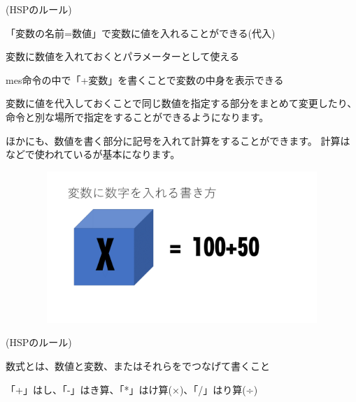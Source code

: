 \begin{description}
    \item (HSPのルール)
\end{description}

\begin{description}
    \item 「変数の名前=数値」で変数に値を入れることができる(代入)
    \item 変数に数値を入れておくとパラメーターとして使える
    \item mes命令の中で「+変数」を書くことで変数の中身を表示できる
\end{description}

変数に値を代入しておくことで同じ数値を指定する部分をまとめて変更したり、命令と別な場所で指定をすることができるようになります。

ほかにも、数値を書く部分に記号を入れて計算をすることができます。
計算はなどで使われているが基本になります。

\begin{figure}[H]
    \begin{center}
        \includegraphics[keepaspectratio,width=11.695cm,height=5.741cm]{text02-img/text02-img046.png}
    \end{center}
\end{figure}

\begin{description}
    \item (HSPのルール)
\end{description}

\begin{description}
    \item 数式とは、数値と変数、またはそれらをでつなげて書くこと
    \item 「+」はし、「-」はき算、「*」はけ算(×)、「/」はり算(÷) 
\end{description}

